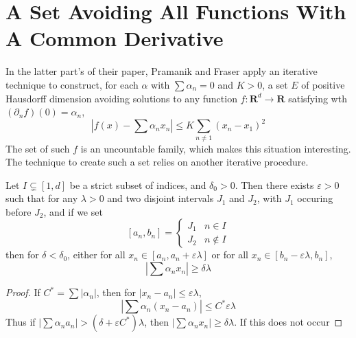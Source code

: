 \section{A Set Avoiding All Functions With A Common Derivative}

In the latter part's of their paper, Pramanik and Fraser apply an iterative technique to construct, for each $\alpha$ with $\sum \alpha_n = 0$ and $K > 0$, a set $E$ of positive Hausdorff dimension avoiding solutions to any function $f: \mathbf{R}^d \to \mathbf{R}$ satisfying wth $(\partial_n f)(0) = \alpha_n$,
%
\[ \left| f(x) - \sum \alpha_n x_n \right| \leq K \sum_{n \neq 1} (x_n - x_1)^2 \]
%
The set of such $f$ is an uncountable family, which makes this situation interesting. The technique to create such a set relies on another iterative procedure.

\begin{lemma}
    Let $I \subsetneq [1,d]$ be a strict subset of indices, and $\delta_0 > 0$. Then there exists $\varepsilon > 0$ such that for any $\lambda > 0$ and two disjoint intervals $J_1$ and $J_2$, with $J_1$ occuring before $J_2$, and if we set
    \[ [a_n,b_n] = \begin{cases} J_1 & n \in I \\ J_2 & n \not \in I \end{cases} \]
    then for $\delta < \delta_0$, either for all $x_n \in [a_n,a_n+\varepsilon \lambda]$ or for all $x_n \in [b_n - \varepsilon \lambda, b_n]$,
    \[ \left| \sum \alpha_n x_n \right| \geq \delta \lambda \]
\end{lemma}
\begin{proof}
    If $C^* = \sum |\alpha_n|$, then for $|x_n - a_n| \leq \varepsilon \lambda$,
    \[ |\sum \alpha_n (x_n - a_n)| \leq C^* \varepsilon \lambda \]
    Thus if $|\sum \alpha_n a_n| > (\delta + \varepsilon C^*)\lambda$, then $|\sum \alpha_n x_n| \geq \delta \lambda$. If this does not occur
\end{proof}

\endinput